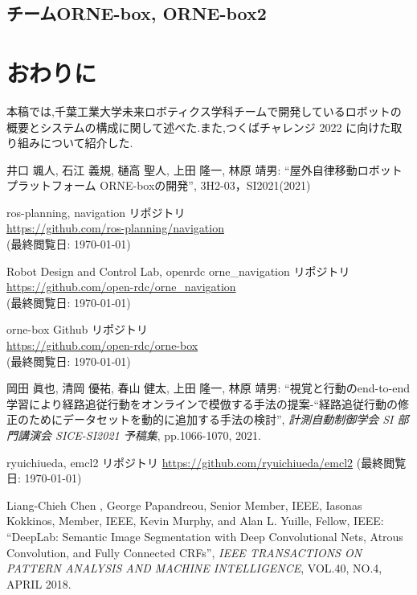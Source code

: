 \documentclass[uplatex, twocolumn, 9pt]{jsproceedings}
\begin{document}

\subsection{チームORNE-box, ORNE-box2}

\section{おわりに}
本稿では,千葉工業大学未来ロボティクス学科チームで開発しているロボットの概要とシステムの構成に関して述べた.また,つくばチャレンジ 2022 に向けた取り組みについて紹介した.


\footnotesize
\begin{thebibliography}{99}

井口 颯人, 石江 義規, 樋高 聖人, 上田 隆一, 林原 靖男: ``屋外自律移動ロボットプラットフォーム ORNE-boxの開発'', 3H2-03，SI2021(2021)

ros-planning, navigation リポジトリ\\
\url{https://github.com/ros-planning/navigation}\\
(最終閲覧日: \today)

Robot Design and Control Lab, openrdc orne\_navigation リポジトリ\\
\url{https://github.com/open-rdc/orne_navigation}\\
(最終閲覧日: \today)

orne-box Github リポジトリ\\
\url{https://github.com/open-rdc/orne-box}\\
(最終閲覧日: \today)

岡田 眞也, 清岡 優祐, 春山 健太, 上田 隆一, 林原 靖男: ``視覚と行動のend-to-end学習により経路追従行動をオンラインで模倣する手法の提案-“経路追従行動の修正のためにデータセットを動的に追加する手法の検討'', \textit{計測自動制御学会 SI 部門講演会 SICE-SI2021 予稿集}, pp.1066-1070, 2021.

ryuichiueda, emcl2 リポジトリ
\url{https://github.com/ryuichiueda/emcl2}
(最終閲覧日: \today)

Liang-Chieh Chen , George Papandreou, Senior Member, IEEE, Iasonas Kokkinos, Member, IEEE,
Kevin Murphy, and Alan L. Yuille, Fellow, IEEE: ``DeepLab: Semantic Image Segmentation with
Deep Convolutional Nets, Atrous Convolution, and Fully Connected CRFs'', \textit{IEEE TRANSACTIONS ON PATTERN ANALYSIS AND MACHINE INTELLIGENCE}, VOL.40, NO.4, APRIL 2018.


\end{thebibliography}
\end{document}
